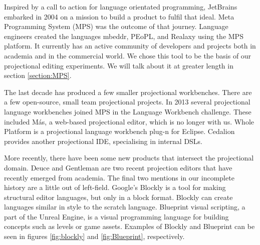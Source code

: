 Inspired by a call to action for language orientated programming\cite{dmitriev2004language}, JetBrains embarked in 2004 on a mission to build a product to fulfil that ideal.  
Meta Programming System (MPS) was the outcome of that journey.   
Language engineers created the languages mbeddr, PEoPL, and Realaxy using the MPS platform.  
It currently has an active community of developers and projects both in academia and in the commercial world. 
We chose this tool to be the basis of our projectional editing experiments. 
We will talk about it at greater length in section \ref{section:MPS}.

The last decade has produced a few smaller projectional workbenches.
There are a few open-source, small team projectional projects. 
In 2013 several projectional language workbenches joined MPS in the Language Workbench challenge\cite{erdweg2015evaluating}.
These included M\'as, a web-based projectional editor, which is no longer with us\cite{MasPostMortem}.
Whole Platform\cite{WholePlatformProductPage} is a projectional language workbench plug-n for Eclipse.
Cedalion\cite{lorenz2011cedalion} provides another projectional IDE, specialising in internal DSLs.


More recently, there have been some new products that intersect the projectional domain.
Deuce\cite{hempel2018deuce} and Gentleman\cite{lafontant2020gentleman_SLR} are two recent projection editors that have recently emerged from academia.
The final two mentions in our incomplete history are a little out of left-field. 
Google's Blockly\cite{Blockly_ProductPage} is a tool for making structural editor languages, but only in a block format.
Blockly can create languages similar in style to the scratch language. 
Blueprint visual scripting, a part of the Unreal Engine, is a visual programming language for building concepts such as levels or game assets.
Examples of Blockly and Blueprint can be seen in figures \ref{fig:blockly} and \ref{fig:Blueprint}, respectively.

